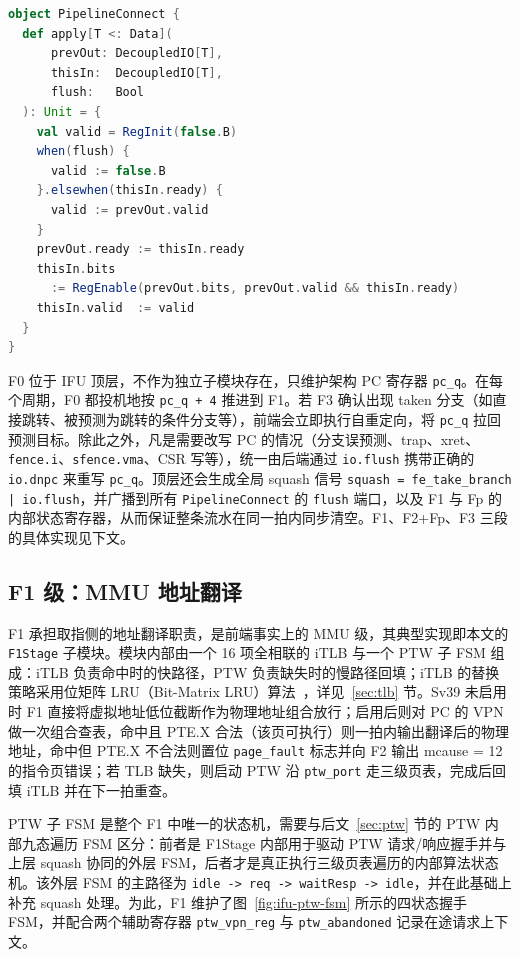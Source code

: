 \begin{lstlisting}[language=Scala,caption={参数化流水段 PipelineConnect 的实现},label={lst:pipeline-connect}]
object PipelineConnect {
  def apply[T <: Data](
      prevOut: DecoupledIO[T],
      thisIn:  DecoupledIO[T],
      flush:   Bool
  ): Unit = {
    val valid = RegInit(false.B)
    when(flush) {
      valid := false.B
    }.elsewhen(thisIn.ready) {
      valid := prevOut.valid
    }
    prevOut.ready := thisIn.ready
    thisIn.bits
      := RegEnable(prevOut.bits, prevOut.valid && thisIn.ready)
    thisIn.valid  := valid
  }
}
\end{lstlisting}

F0 位于 IFU 顶层，不作为独立子模块存在，只维护架构 PC 寄存器 \lstinline|pc_q|。在每个周期，F0 都投机地按 \lstinline|pc_q + 4| 推进到 F1。若 F3 确认出现 taken 分支（如直接跳转、被预测为跳转的条件分支等），前端会立即执行自重定向，将 \lstinline|pc_q| 拉回预测目标。除此之外，凡是需要改写 PC 的情况（分支误预测、trap、xret、\lstinline|fence.i|、\lstinline|sfence.vma|、CSR 写等），统一由后端通过 \lstinline|io.flush| 携带正确的 \lstinline|io.dnpc| 来重写 \lstinline|pc_q|。顶层还会生成全局 squash 信号 \lstinline!squash = fe_take_branch | io.flush!，并广播到所有 \lstinline|PipelineConnect| 的 \lstinline|flush| 端口，以及 F1 与 Fp 的内部状态寄存器，从而保证整条流水在同一拍内同步清空。F1、F2+Fp、F3 三段的具体实现见下文。

\subsection{F1 级：MMU 地址翻译}\label{sec:ifu-mmu}

F1 承担取指侧的地址翻译职责，是前端事实上的 MMU 级，其典型实现即本文的 \lstinline|F1Stage| 子模块。模块内部由一个 16 项全相联的 iTLB 与一个 PTW 子 FSM 组成：iTLB 负责命中时的快路径，PTW 负责缺失时的慢路径回填；iTLB 的替换策略采用位矩阵 LRU（Bit-Matrix LRU）算法~\cite{belady1966replacement}，详见~\ref{sec:tlb} 节。Sv39 未启用时 F1 直接将虚拟地址低位截断作为物理地址组合放行；启用后则对 PC 的 VPN 做一次组合查表，命中且 PTE.X 合法（该页可执行）则一拍内输出翻译后的物理地址，命中但 PTE.X 不合法则置位 \lstinline|page_fault| 标志并向 F2 输出 mcause = 12 的指令页错误；若 TLB 缺失，则启动 PTW 沿 \lstinline|ptw_port| 走三级页表，完成后回填 iTLB 并在下一拍重查。

PTW 子 FSM 是整个 F1 中唯一的状态机，需要与后文~\ref{sec:ptw} 节的 PTW 内部九态遍历 FSM 区分：前者是 F1Stage 内部用于驱动 PTW 请求/响应握手并与上层 squash 协同的外层 FSM，后者才是真正执行三级页表遍历的内部算法状态机。该外层 FSM 的主路径为 \lstinline|idle -> req -> waitResp -> idle|，并在此基础上补充 squash 处理。为此，F1 维护了图~\ref{fig:ifu-ptw-fsm} 所示的四状态握手 FSM，并配合两个辅助寄存器 \lstinline|ptw_vpn_reg| 与 \lstinline|ptw_abandoned| 记录在途请求上下文。

